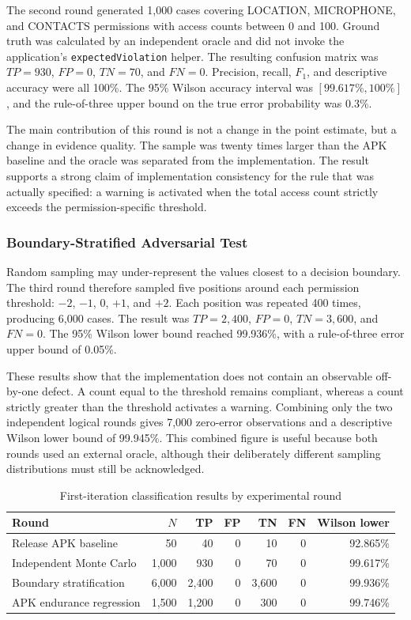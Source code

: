 The second round generated 1,000 cases covering LOCATION, MICROPHONE, and CONTACTS permissions with access counts between 0 and 100. Ground truth was calculated by an independent oracle and did not invoke the application's \texttt{expectedViolation} helper. The resulting confusion matrix was \(TP=930\), \(FP=0\), \(TN=70\), and \(FN=0\). Precision, recall, \(F_1\), and descriptive accuracy were all 100\%. The 95\% Wilson accuracy interval was \([99.617\%,100\%]\), and the rule-of-three upper bound on the true error probability was 0.3\%.

The main contribution of this round is not a change in the point estimate, but a change in evidence quality. The sample was twenty times larger than the APK baseline and the oracle was separated from the implementation. The result supports a strong claim of implementation consistency for the rule that was actually specified: a warning is activated when the total access count strictly exceeds the permission-specific threshold.

\subsubsection{Boundary-Stratified Adversarial Test}

Random sampling may under-represent the values closest to a decision boundary. The third round therefore sampled five positions around each permission threshold: \(-2\), \(-1\), \(0\), \(+1\), and \(+2\). Each position was repeated 400 times, producing 6,000 cases. The result was \(TP=2,400\), \(FP=0\), \(TN=3,600\), and \(FN=0\). The 95\% Wilson lower bound reached 99.936\%, with a rule-of-three error upper bound of 0.05\%.

These results show that the implementation does not contain an observable off-by-one defect. A count equal to the threshold remains compliant, whereas a count strictly greater than the threshold activates a warning. Combining only the two independent logical rounds gives 7,000 zero-error observations and a descriptive Wilson lower bound of 99.945\%. This combined figure is useful because both rounds used an external oracle, although their deliberately different sampling distributions must still be acknowledged.

\begin{table}[H]
\centering
\caption{First-iteration classification results by experimental round}
\label{tab:ch5-first-iteration}
\small
\begin{tabular}{lrrrrrr}
\toprule
\textbf{Round} & \textbf{\(N\)} & \textbf{TP} & \textbf{FP} & \textbf{TN} & \textbf{FN} & \textbf{Wilson lower} \\
\midrule
Release APK baseline & 50 & 40 & 0 & 10 & 0 & 92.865\% \\
Independent Monte Carlo & 1,000 & 930 & 0 & 70 & 0 & 99.617\% \\
Boundary stratification & 6,000 & 2,400 & 0 & 3,600 & 0 & 99.936\% \\
APK endurance regression & 1,500 & 1,200 & 0 & 300 & 0 & 99.746\% \\
\bottomrule
\end{tabular}
\end{table}

